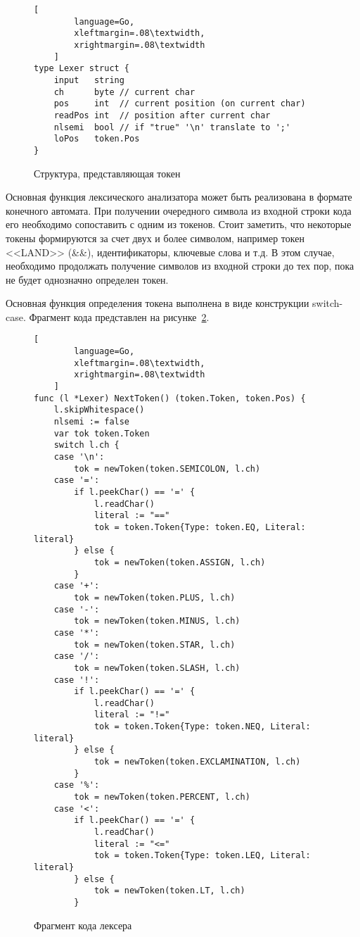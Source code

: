 \begin{figure}[ht]
	\centering
	\vspace{\toppaddingoffigure}
	\begin{lstlisting}[
        language=Go,
        xleftmargin=.08\textwidth,
        xrightmargin=.08\textwidth
    ]
type Lexer struct {
    input   string
    ch      byte // current char
    pos     int  // current position (on current char)
    readPos int  // position after current char
    nlsemi  bool // if "true" '\n' translate to ';'
    loPos   token.Pos
}    
\end{lstlisting}
	\caption{Структура, представляющая токен}
	\label{f:code_lexerStruct}
\end{figure}

Основная функция лексического анализатора может быть реализована в формате конечного автомата.
При получении очередного символа из входной строки кода его необходимо сопоставить с одним из токенов.
Стоит заметить, что некоторые токены формируются за счет двух и более символом, например токен <<LAND>> (\&\&), идентификаторы, ключевые слова и т.д. 
В этом случае, необходимо продолжать получение символов из входной строки до тех пор, пока не будет однозначно определен токен.

Основная функция определения токена выполнена в виде конструкции switch-case.
Фрагмент кода представлен на рисунке~\ref{f:code_lexerFragment}.


\clearpage

\begin{figure}[!ht]
	\centering
	\vspace{\toppaddingoffigure}
    \begin{lstlisting}[
        language=Go,
        xleftmargin=.08\textwidth,
        xrightmargin=.08\textwidth
    ]
func (l *Lexer) NextToken() (token.Token, token.Pos) {
    l.skipWhitespace()
    nlsemi := false
    var tok token.Token
    switch l.ch {
    case '\n':
        tok = newToken(token.SEMICOLON, l.ch)
    case '=':
        if l.peekChar() == '=' {
            l.readChar()
            literal := "=="
            tok = token.Token{Type: token.EQ, Literal: literal}
        } else {
            tok = newToken(token.ASSIGN, l.ch)
        }
    case '+':
        tok = newToken(token.PLUS, l.ch)
    case '-':
        tok = newToken(token.MINUS, l.ch)
    case '*':
        tok = newToken(token.STAR, l.ch)
    case '/':
        tok = newToken(token.SLASH, l.ch)
    case '!':
        if l.peekChar() == '=' {
            l.readChar()
            literal := "!="
            tok = token.Token{Type: token.NEQ, Literal: literal}
        } else {
            tok = newToken(token.EXCLAMINATION, l.ch)
        }
    case '%':
		tok = newToken(token.PERCENT, l.ch)
	case '<':
		if l.peekChar() == '=' {
			l.readChar()
			literal := "<="
			tok = token.Token{Type: token.LEQ, Literal: literal}
		} else {
			tok = newToken(token.LT, l.ch)
		}
\end{lstlisting}
	\caption{Фрагмент кода лексера}
	\label{f:code_lexerFragment}
\end{figure}